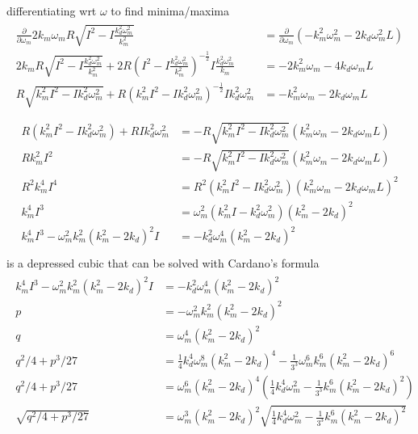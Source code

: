 \documentclass[12pt,a4paper,oneside,openany]{article}
\begin{document}
differentiating wrt $\omega$ to find minima/maxima
\begin{gather}
\begin{aligned}
\frac{\partial}{\partial \omega_m} 2 k_m \omega_m R \sqrt{I^2-I\frac{k_d^2 \omega_m^2}{k_m^2}}& = \frac{\partial}{\partial \omega_m} \left( -k_m^2\omega_m^2 - 2 k_d \omega_m^2 L \right)\\
2 k_m R \sqrt{I^2-I\frac{k_d^2 \omega_m^2}{k_m^2}} +  2 R  \left(I^2-I\frac{k_d^2 \omega_m^2}{k_m^2}\right)^{-\frac{1}{2}} I\frac{k_d^2 \omega_m^2}{k_m} & =   - 2k_m^2\omega_m - 4 k_d \omega_m L \\
R \sqrt{k_m^2 I^2-I k_d^2 \omega_m^2} +  R  \left(k_m^2 I^2 - I k_d^2 \omega_m^2\right)^{-\frac{1}{2}} I k_d^2 \omega_m^2  & = - k_m^2\omega_m - 2 k_d \omega_m L \\
\end{aligned}
\end{gather}
\begin{gather}
\begin{aligned}
R \left(k_m^2 I^2 - I k_d^2 \omega_m^2 \right) +  R I k_d^2 \omega_m^2  & = - R \sqrt{k_m^2 I^2-I k_d^2 \omega_m^2} \left(k_m^2\omega_m - 2 k_d \omega_m L \right) \\
R k_m^2 I^2  & = - R \sqrt{k_m^2 I^2-I k_d^2 \omega_m^2} \left(k_m^2\omega_m - 2 k_d \omega_m L \right) \\
R^2 k_m^4 I^4  & = R^2 \left( k_m^2 I^2-I k_d^2 \omega_m^2 \right) \left(k_m^2\omega_m - 2 k_d \omega_m L \right)^2 \\
k_m^4 I^3  & = \omega_m^2 \left( k_m^2 I - k_d^2 \omega_m^2 \right) \left(k_m^2 - 2 k_d \right)^2 \\
k_m^4 I^3   - \omega_m^2 k_m^2 \left(k_m^2 - 2 k_d \right)^2 I & = - k_d^2 \omega_m^4  \left(k_m^2 - 2 k_d \right)^2 \\
\end{aligned}
\end{gather}
is a depressed cubic that can be solved with Cardano's formula
\begin{gather}
\begin{aligned}
k_m^4 I^3 - \omega_m^2 k_m^2 \left(k_m^2 - 2 k_d \right)^2 I & = - k_d^2 \omega_m^4  \left(k_m^2 - 2 k_d \right)^2 \\
p &= - \omega_m^2 k_m^2 \left(k_m^2 - 2 k_d \right)^2 \\
q &= \omega_m^4  \left(k_m^2 - 2 k_d \right)^2 \\
q^2/4 + p^3/27 &= \frac{1}{4} k_d^4 \omega_m^8  \left(k_m^2 - 2 k_d \right)^4 - \frac{1}{3^3} \omega_m^6 k_m^6 \left(k_m^2 - 2 k_d \right)^6 \\
q^2/4 + p^3/27 &= \omega_m^6 \left(k_m^2 - 2 k_d \right)^4 \left(\frac{1}{4}k_d^4 \omega_m^2   - \frac{1}{3^3} k_m^6 \left(k_m^2 - 2 k_d \right)^2 \right) \\
\sqrt{q^2/4 + p^3/27} &= \omega_m^3 \left(k_m^2 - 2 k_d \right)^2 \sqrt{\frac{1}{4}k_d^4 \omega_m^2- \frac{1}{3^3} k_m^6 \left(k_m^2 - 2 k_d \right)^2 } \\
\end{aligned}
\end{gather}
\end{document}
